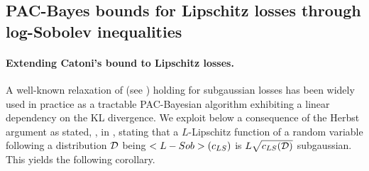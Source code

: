 \begin{noaddcontents}
\begin{comment}
      \begin{lemma}[Theorem 3.3, \citealp{liL2022sgd}]
      \label{l: sgd_gradient_bounds}
      Assume \textbf{(A1)}. Let $\mathbf{h}_t$ be the iterate produced by Algorithm 1. Assume $\eta_t=$ $\eta_1 t^{-\frac{1}{2}}$ with $\eta_1 \leq 1 /(2 G)$. For any $\delta \in(0,1)$ and uniformly for all $t=1, \ldots T$, with probability $1-\delta$,
    (a) if $\theta=\frac{1}{2}$, then we have the following inequality
    $$
    \begin{aligned}
     \left\|\nabla \Risk_\D\left(\mathbf{h}_{t+1}\right)-\nabla \hat{\Risk}_{\S_m}\left(\mathbf{h}_{t+1}\right)\right\|^2  
     & = \mathcal{O}\left(\frac{T^{\frac{1}{2}} \log ^2\left(\frac{1}{\delta}\right)(\log T)\left(d+\log \left(\frac{1}{\delta}\right)\right)}{m}\right) ;
    \end{aligned}
    $$
    (b) if $\theta \in\left(\frac{1}{2}, 1\right)$ and Assumption \textbf{(A2)} holds, then we have
    $$
    \begin{aligned}
     \left\|\nabla \Risk_\D\left(\mathbf{h}_{t+1}\right)-\nabla \hat{\Risk}_{\S_m}\left(\mathbf{h}_{t+1}\right)\right\|^2 
    & =  \mathcal{O}\left(\frac{T^{\frac{1}{2}} \log ^{2 \theta+1}\left(\frac{1}{\delta}\right)(\log T)\left(d+\log \left(\frac{1}{\delta}\right)\right)}{m}\right) ;
    \end{aligned}
    $$
    (c) if $\theta>1$ and Assumption \textbf{(A2)} holds, then we have
    $$
    \begin{aligned}
    & \left\|\nabla \Risk_\D\left(\mathbf{h}_{t+1}\right)-\nabla \hat{\Risk}_{\S_m}\left(\mathbf{h}_{t+1}\right)\right\|^2 = & \\
    & \mathcal{O}\left(\left(d+\log \left(\frac{1}{\delta}\right)\right)\right. \left.\times \frac{T^{\frac{1}{2}}\left(\log ^{\theta-1}(T / \delta) \log (1 / \delta)+\log ^{(2 \theta+1)}\left(\frac{1}{\delta}\right) \log T\right)}{m}\right)  .
    \end{aligned}
    $$
    \end{lemma}
    \end{comment}
    
    
    \section{PAC-Bayes bounds for Lipschitz losses through log-Sobolev inequalities}
    \label{sec: lpz_results}
    \paragraph{Extending Catoni's bound to Lipschitz losses.}
    A well-known relaxation of \citet[Theorem 1.2.6]{catoni2007pac} (see \eg \citealp[Theorem 4.1]{alquier2016properties}) holding for subgaussian losses has been widely used in practice as a tractable PAC-Bayesian algorithm exhibiting a linear dependency on the KL divergence. We exploit below a consequence of the Herbst argument as stated, \eg,  in \citet[Section 2.3]{ledoux2006concentration}, stating that a $L$-Lipschitz function of a random variable following a distribution $\mathcal{D}$ being $<L-Sob>(c_{LS})$ is $L\sqrt{c_{LS}(\mathcal{D})}$ subgaussian. This yields the following corollary. 
    

\end{noaddcontents}
